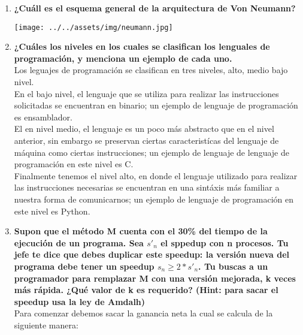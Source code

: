 \documentclass[14pt,letterpaper,fleqn]{article}
\begin{document}
    \begin{enumerate}
    
        \item \textbf{¿Cuáll es el esquema general de la arquitectura de Von Neumann?}
        \begin{center}
                \texttt{[image: ../../assets/img/neumann.jpg]}
            \end{center}
        \item \textbf{¿Cuáles los niveles en los cuales se clasifican los lenguales de programación, y menciona un ejemplo de cada uno.}
        \\Los leguajes de programación se clasifican en tres niveles, alto, medio bajo nivel.\\
        En el bajo nivel, el lenguaje que se utiliza para realizar las instrucciones solicitadas se encuentran en binario; un ejemplo de lenguaje de programación es ensamblador.\\
        El en nivel medio, el lenguaje es un poco más abstracto que en el nivel anterior, sin embargo se preservan ciertas caracteristícas del lenguaje de máquina como ciertas instrucciones; un ejemplo de lenguaje de lenguaje de programación en este nivel es C.\\
        Finalmente tenemos el nivel alto, en donde el lenguaje utilizado para realizar las instrucciones necesarias se encuentran en una sintáxis más familiar a nuestra forma de comunicarnos; un ejemplo de lenguaje de programación en este nivel es Python.
        
        \item \textbf{Supon que el método M cuenta con el 30\% del tiempo de la ejecución de un programa. Sea $s'_n$ el sppedup con n procesos. Tu jefe te dice que debes duplicar este speedup: la versión nueva del programa debe tener un speedup $s_n \geq  2 * s'_n$. Tu buscas a un programador para remplazar M con una versión mejorada, k veces más rápida. ¿Qué valor de k es requerido? (Hint: para sacar el speedup usa la ley de Amdalh)}
        \\Para comenzar debemos sacar la ganancia neta la cual se calcula de la siguiente manera:


\end{enumerate}
\end{document}
